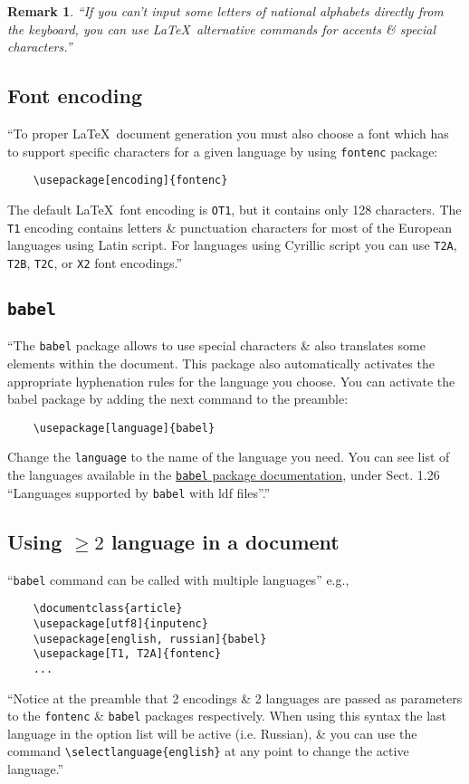 \documentclass{article}
\numberwithin{equation}{section}
\newtheorem{remark}{Remark}[section]
\begin{document}
\begin{remark}
	``If you can't input some letters of national alphabets directly from the keyboard, you can use \LaTeX\ alternative commands for accents \& special characters.''
\end{remark}

\subsection{Font encoding}
``To proper \LaTeX\ document generation you must also choose a font which has to support specific characters for a given language by using \texttt{fontenc} package:
\begin{verbatim}
	\usepackage[encoding]{fontenc}
\end{verbatim}
The default \LaTeX\ font encoding is \texttt{OT1}, but it contains only 128 characters. The \texttt{T1} encoding contains letters \& punctuation characters for most of the European languages using Latin script. For languages using Cyrillic script you can use \texttt{T2A}, \texttt{T2B}, \texttt{T2C}, or \texttt{X2} font encodings.''

\subsection{\texttt{babel}}
``The \texttt{babel} package allows to use special characters \& also translates some elements within the document. This package also automatically activates the appropriate hyphenation rules for the language you choose. You can activate the babel package by adding the next command to the preamble:
\begin{verbatim}
	\usepackage[language]{babel}
\end{verbatim}
Change the \texttt{language} to the name of the language you need. You can see list of the languages available in the \href{http://texdoc.net/pkg/babel}{\texttt{babel} package documentation}, under Sect. 1.26 ``Languages supported by \texttt{babel} with ldf files''.'' 

\subsection{Using $\ge 2$ language in a document}
``\texttt{babel} command can be called with multiple languages'' e.g.,
\begin{verbatim}
	\documentclass{article}
	\usepackage[utf8]{inputenc}
	\usepackage[english, russian]{babel}
	\usepackage[T1, T2A]{fontenc}
	...
\end{verbatim}
``Notice at the preamble that 2 encodings \& 2 languages are passed as parameters to the \texttt{fontenc} \& \texttt{babel} packages respectively. When using this syntax the last language in the option list will be active (i.e. Russian), \& you can use the command \verb|\selectlanguage{english}| at any point to change the active language.''
\end{document}
